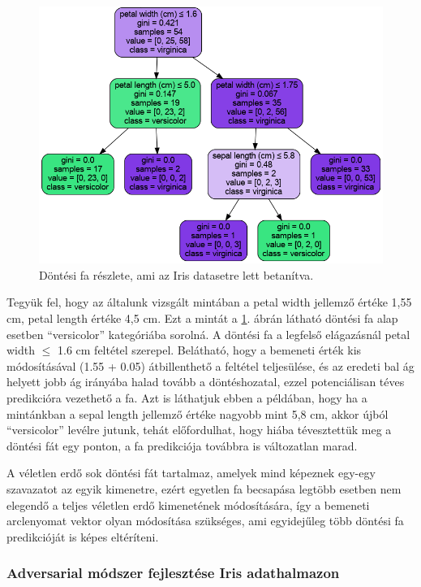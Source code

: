 \begin{figure}[ht]
	\centering
	\includegraphics[width=0.9\columnwidth]{figures/adverse_tree_graph.png}
	\caption{Döntési fa részlete, ami az Iris datasetre lett betanítva.}
	\label{fig:iris_tree}
\end{figure}

Tegyük fel, hogy az általunk vizsgált mintában a petal width jellemző értéke 1,55 cm, petal length értéke 4,5 cm. Ezt a mintát a \ref{fig:iris_tree}. ábrán látható döntési fa alap esetben ``versicolor'' kategóriába sorolná. A döntési fa a legfelső elágazásnál petal width $\le$ 1.6 cm feltétel szerepel. Belátható, hogy a bemeneti érték kis módosításával (1.55 + 0.05) átbillenthető a feltétel teljesülése, és az eredeti bal ág helyett jobb ág irányába halad tovább a döntéshozatal, ezzel potenciálisan téves predikcióra vezethető a fa. Azt is láthatjuk ebben a példában, hogy ha a mintánkban a sepal length jellemző értéke nagyobb mint 5,8 cm, akkor újból ``versicolor'' levélre jutunk, tehát előfordulhat, hogy hiába tévesztettük meg a döntési fát egy ponton, a fa predikciója továbbra is változatlan marad.

A véletlen erdő sok döntési fát tartalmaz, amelyek mind képeznek egy-egy szavazatot az egyik kimenetre, ezért egyetlen fa becsapása legtöbb esetben nem elegendő a teljes véletlen erdő kimenetének módosítására, így a bemeneti arclenyomat vektor olyan módosítása szükséges, ami egyidejűleg több döntési fa predikcióját is képes eltéríteni.

\subsubsection*{Adversarial módszer fejlesztése Iris adathalmazon}

